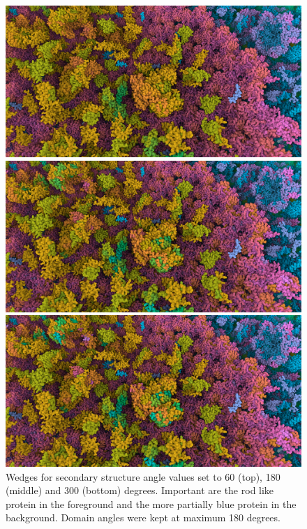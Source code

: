 \documentclass{article}
\begin{document}
	\begin{figure}[t]
		\includegraphics[width=0.95\linewidth,keepaspectratio]{supplementaryMaterial/secondary60} 
		
		\vspace{0.1cm}
		
		\includegraphics[width=0.95\linewidth,keepaspectratio]{supplementaryMaterial/secondary180} 
		
		\vspace{0.1cm}
		
		\includegraphics[width=0.95\linewidth,keepaspectratio]{supplementaryMaterial/secondary300} 
		\caption{Wedges for secondary structure angle values set to 60 (top), 180 (middle) and 300 (bottom) degrees. Important are the rod like protein in the foreground and the more partially blue protein in the background. Domain angles were kept at maximum 180 degrees.}
	\end{figure}
	
\end{document}

